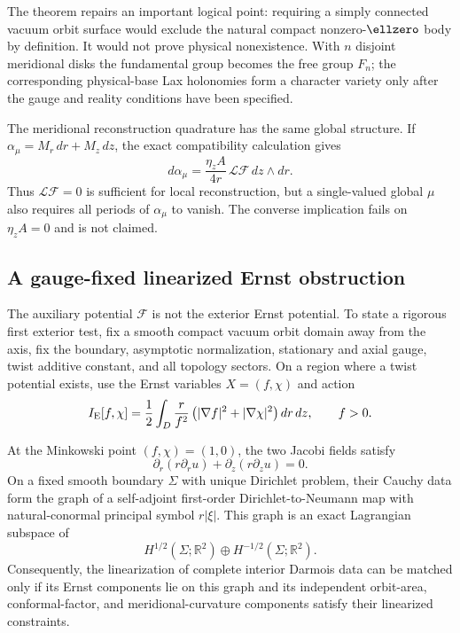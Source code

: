 The theorem repairs an important logical point: requiring a simply connected
vacuum orbit surface would exclude the natural compact nonzero-$\ellzero$
body by definition. It would not prove physical nonexistence. With $n$
disjoint meridional disks the fundamental group becomes the free group
$F_n$; the corresponding physical-base Lax holonomies form a character
variety only after the gauge and reality conditions have been specified.

The meridional reconstruction quadrature has the same global structure. If
$\alpha_\mu=M_r\,dr+M_z\,dz$, the exact compatibility calculation gives
$$
d\alpha_\mu
=\frac{\eta_zA}{4r}\,\mathcal L\mathcal F\,dz\wedge dr.
$$
Thus $\mathcal L\mathcal F=0$ is sufficient for local reconstruction, but a
single-valued global $\mu$ also requires all periods of $\alpha_\mu$ to
vanish. The converse implication fails on $\eta_zA=0$ and is not claimed.

\subsection{A gauge-fixed linearized Ernst obstruction}

The auxiliary potential $\mathcal F$ is not the exterior Ernst potential.
To state a rigorous first exterior test, fix a smooth compact vacuum orbit
domain away from the axis, fix the boundary, asymptotic normalization,
stationary and axial gauge, twist additive constant, and all topology
sectors. On a region where a twist potential exists, use the Ernst variables
$X=(f,\chi)$ and action
\begin{equation}
I_{\rm E}[f,\chi]
=\frac12\int_D\frac r{f^2}
\left(|\nabla f|^2+|\nabla\chi|^2\right)dr\,dz,
\qquad f>0.
\label{eq:ernst-sigma-action}
\end{equation}

\begin{theorem}
\label{thm:linearized-ernst-calderon}
At the Minkowski point $(f,\chi)=(1,0)$, the two Jacobi fields satisfy
$$
\partial_r(r\partial_r u)+\partial_z(r\partial_z u)=0.
$$
On a fixed smooth boundary $\Sigma$ with unique Dirichlet problem, their
Cauchy data form the graph of a self-adjoint first-order
Dirichlet-to-Neumann map with natural-conormal principal symbol
$r|\xi|$. This graph is an exact Lagrangian subspace of
$$
H^{1/2}(\Sigma;\mathbb R^2)
\oplus H^{-1/2}(\Sigma;\mathbb R^2).
$$
Consequently, the linearization of complete interior Darmois data can be
matched only if its Ernst components lie on this graph and its independent
orbit-area, conformal-factor, and meridional-curvature components satisfy
their linearized constraints.
\end{theorem}

